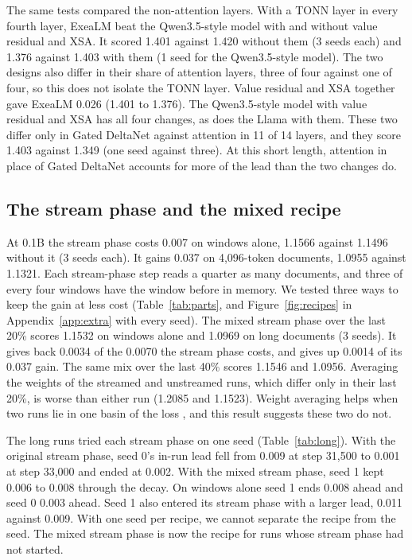 \documentclass[10pt,twocolumn,letterpaper]{article}
\begin{document}
The same tests compared the non-attention layers.
With a TONN layer in every fourth layer, ExeaLM beat the Qwen3.5-style model with and without value residual and XSA.
It scored 1.401 against 1.420 without them (3 seeds each) and 1.376 against 1.403 with them (1 seed for the Qwen3.5-style model).
The two designs also differ in their share of attention layers, three of four against one of four, so this does not isolate the TONN layer.
Value residual and XSA together gave ExeaLM 0.026 (1.401 to 1.376).
The Qwen3.5-style model with value residual and XSA has all four changes, as does the Llama with them.
These two differ only in Gated DeltaNet against attention in 11 of 14 layers, and they score 1.403 against 1.349 (one seed against three).
At this short length, attention in place of Gated DeltaNet accounts for more of the lead than the two changes do.

\subsection{The stream phase and the mixed recipe}
\label{sec:recipe}

At 0.1B the stream phase costs 0.007 on windows alone, 1.1566 against 1.1496 without it (3 seeds each).
It gains 0.037 on 4,096-token documents, 1.0955 against 1.1321.
Each stream-phase step reads a quarter as many documents, and three of every four windows have the window before in memory.
We tested three ways to keep the gain at less cost (Table~\ref{tab:parts}, and Figure~\ref{fig:recipes} in Appendix~\ref{app:extra} with every seed).
The mixed stream phase over the last 20\% scores 1.1532 on windows alone and 1.0969 on long documents (3 seeds).
It gives back 0.0034 of the 0.0070 the stream phase costs, and gives up 0.0014 of its 0.037 gain.
The same mix over the last 40\% scores 1.1546 and 1.0956.
Averaging the weights of the streamed and unstreamed runs, which differ only in their last 20\%, is worse than either run (1.2085 and 1.1523).
Weight averaging helps when two runs lie in one basin of the loss \citep{frankle2020linear,wortsman2022soups}, and this result suggests these two do not.

The long runs tried each stream phase on one seed (Table~\ref{tab:long}).
With the original stream phase, seed 0's in-run lead fell from 0.009 at step 31,500 to 0.001 at step 33,000 and ended at 0.002.
With the mixed stream phase, seed 1 kept 0.006 to 0.008 through the decay.
On windows alone seed 1 ends 0.008 ahead and seed 0 0.003 ahead.
Seed 1 also entered its stream phase with a larger lead, 0.011 against 0.009.
With one seed per recipe, we cannot separate the recipe from the seed.
The mixed stream phase is now the recipe for runs whose stream phase had not started.
\end{document}
